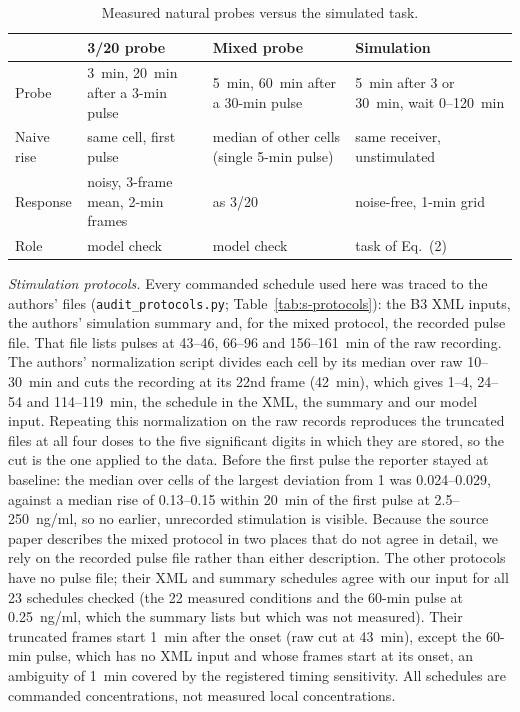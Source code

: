 \documentclass[conference]{IEEEtran}
\begin{document}
\begin{table}[t]
\caption{Measured natural probes versus the simulated task.}
\label{tab:s-task}
\centering\footnotesize\setlength{\tabcolsep}{2.2pt}
\begin{tabular}{p{1.25cm}p{2.1cm}p{2.1cm}p{2.1cm}}
\toprule
 & 3/20 probe & Mixed probe & Simulation \\
\midrule
Probe & 3~min, 20~min after a 3-min pulse & 5~min, 60~min after a 30-min pulse & 5~min after 3 or 30~min, wait 0--120~min \\
Naive rise & same cell, first pulse & median of other cells (single 5-min pulse) & same receiver, unstimulated \\
Response & noisy, 3-frame mean, 2-min frames & as 3/20 & noise-free, 1-min grid \\
Role & model check & model check & task of Eq.~(2) \\
\bottomrule
\end{tabular}
\end{table}

\emph{Stimulation protocols.} Every commanded schedule used here was traced to the authors' files (\texttt{audit\_protocols.py}; Table~\ref{tab:s-protocols}): the B3 XML inputs, the authors' simulation summary and, for the mixed protocol, the recorded pulse file. That file lists pulses at 43--46, 66--96 and 156--161~min of the raw recording. The authors' normalization script divides each cell by its median over raw 10--30~min and cuts the recording at its 22nd frame (42~min), which gives 1--4, 24--54 and 114--119~min, the schedule in the XML, the summary and our model input. Repeating this normalization on the raw records reproduces the truncated files at all four doses to the five significant digits in which they are stored, so the cut is the one applied to the data. Before the first pulse the reporter stayed at baseline: the median over cells of the largest deviation from 1 was 0.024--0.029, against a median rise of 0.13--0.15 within 20~min of the first pulse at 2.5--250~ng/ml, so no earlier, unrecorded stimulation is visible. Because the source paper describes the mixed protocol in two places that do not agree in detail, we rely on the recorded pulse file rather than either description. The other protocols have no pulse file; their XML and summary schedules agree with our input for all 23 schedules checked (the 22 measured conditions and the 60-min pulse at 0.25~ng/ml, which the summary lists but which was not measured). Their truncated frames start 1~min after the onset (raw cut at 43~min), except the 60-min pulse, which has no XML input and whose frames start at its onset, an ambiguity of 1~min covered by the registered timing sensitivity. All schedules are commanded concentrations, not measured local concentrations.
\end{document}
